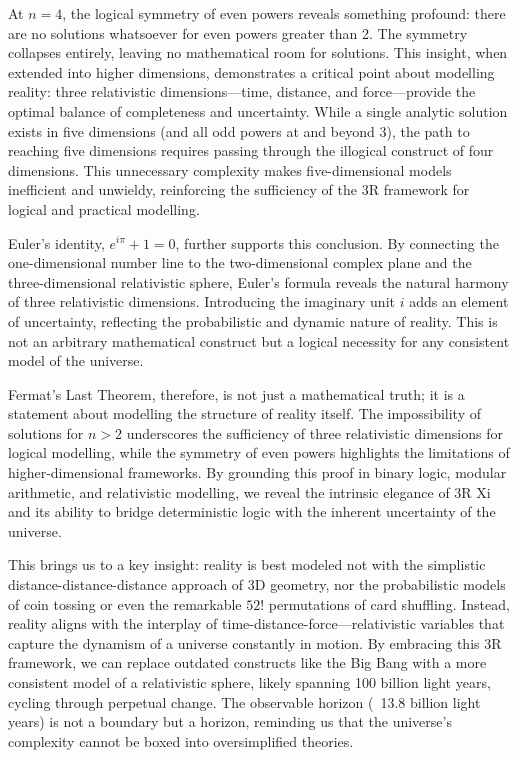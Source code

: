 \documentclass[12pt]{article}
\begin{document}
At \(n = 4\), the logical symmetry of even powers reveals something profound: there are no solutions whatsoever for even powers greater than 2. The symmetry collapses entirely, leaving no mathematical room for solutions. This insight, when extended into higher dimensions, demonstrates a critical point about modelling reality: three relativistic dimensions—time, distance, and force—provide the optimal balance of completeness and uncertainty. While a single analytic solution exists in five dimensions (and all odd powers at and beyond 3), the path to reaching five dimensions requires passing through the illogical construct of four dimensions. This unnecessary complexity makes five-dimensional models inefficient and unwieldy, reinforcing the sufficiency of the 3R framework for logical and practical modelling.

Euler’s identity, \(e^{i\pi} + 1 = 0\), further supports this conclusion. By connecting the one-dimensional number line to the two-dimensional complex plane and the three-dimensional relativistic sphere, Euler’s formula reveals the natural harmony of three relativistic dimensions. Introducing the imaginary unit \(i\) adds an element of uncertainty, reflecting the probabilistic and dynamic nature of reality. This is not an arbitrary mathematical construct but a logical necessity for any consistent model of the universe.

Fermat’s Last Theorem, therefore, is not just a mathematical truth; it is a statement about modelling the structure of reality itself. The impossibility of solutions for \(n > 2\) underscores the sufficiency of three relativistic dimensions for logical modelling, while the symmetry of even powers highlights the limitations of higher-dimensional frameworks. By grounding this proof in binary logic, modular arithmetic, and relativistic modelling, we reveal the intrinsic elegance of 3R Xi and its ability to bridge deterministic logic with the inherent uncertainty of the universe.

This brings us to a key insight: reality is best modeled not with the simplistic distance-distance-distance approach of 3D geometry, nor the probabilistic models of coin tossing or even the remarkable \(52!\) permutations of card shuffling. Instead, reality aligns with the interplay of time-distance-force—relativistic variables that capture the dynamism of a universe constantly in motion. By embracing this 3R framework, we can replace outdated constructs like the Big Bang with a more consistent model of a relativistic sphere, likely spanning 100 billion light years, cycling through perpetual change. The observable horizon (~13.8 billion light years) is not a boundary but a horizon, reminding us that the universe’s complexity cannot be boxed into oversimplified theories.
\end{document}
